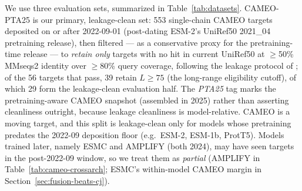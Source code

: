\documentclass{article}
\begin{document}
We use three evaluation sets, summarized in Table~\ref{tab:datasets}.
CAMEO-PTA25 is our primary, leakage-clean set: 553 single-chain CAMEO
targets deposited on or after 2022-09-01 (post-dating ESM-2's UniRef50
2021\_04 pretraining release), then filtered --- as a conservative proxy
for the pretraining-time release --- to \emph{retain only} targets with no
hit in current UniRef50 \citep{suzek2007uniref} at $\geq$50\% MMseqs2
\citep{steinegger2017mmseqs2} identity over $\geq$80\% query coverage,
following the leakage protocol of \citet{hermann2024leakage}; of the 56 targets
that pass, 39 retain $L \geq 75$ (the long-range eligibility cutoff), of
which 29 form the leakage-clean evaluation half. The \emph{PTA25} tag
marks the pretraining-aware CAMEO snapshot (assembled in 2025) rather
than asserting cleanliness outright, because leakage cleanliness is
model-relative. CAMEO is a moving target, and this split is leakage-clean
only for models whose pretraining predates the 2022-09 deposition floor
(e.g.\ ESM-2, ESM-1b, ProtT5). Models trained later, namely ESMC and
AMPLIFY (both 2024), may have seen targets in the post-2022-09 window, so
we treat them as \emph{partial} (AMPLIFY in
Table~\ref{tab:cameo-crossarch}; ESMC's within-model CAMEO margin in
Section~\ref{sec:fusion-beats-cj}).

\begin{table}[h]
\centering
\small
\caption{\textbf{Evaluation sets.} Selection budget is the disjoint
labeled subset on which the top-$K$ heads are picked; it never overlaps
the evaluation draw. The primary, leakage-clean comparison
(Section~\ref{sec:fusion-beats-cj}) runs on CAMEO-PTA25; cross-architecture
reproduction numbers (Appendix~Table~\ref{tab:a1}) and the methodology
analyses (operator comparison, $K$-sweep, cluster-diffuseness, depth
probe, timing) run on Zhang eval-200. CASP14-FM lists the 16 nominal
free-modeling targets; 14--16 are scored per model (a few long targets
are dropped at load on individual cells), with the exact per-cell $N$ in
Table~\ref{tab:a1}.}
\label{tab:datasets}
\end{table}
\end{document}
